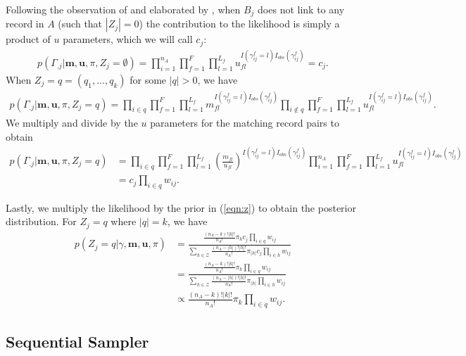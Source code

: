\documentclass[12pt,letterpaper]{article}
\newcommand{\1}[1]{\mathbb{I}\!\left[#1\right]} %
\begin{document}
Following the observation of \cite{wortman2019} and elaborated by \cite{kundinger_2023}, when $B_j$ does not link to any record in $A$ (such that $|Z_j| = 0$) the contribution to the likelihood is simply a product of $u$ parameters, which we will call $c_j$:
\begin{align}
	p(\Gamma_{.j}| \bm{m}, \bm{u}, \pi, Z_j = \emptyset) = \prod_{i=1}^{n_A}\prod_{f=1}^{F}\prod_{l=1}^{L_f} u_{fl}^{I(\gamma_{ij}^f = l)I_{obs}(\gamma_{ij}^f)} = c_j.
\end{align}
When $Z_j = q =  (q_1, \ldots, q_k)$ for some $|q| > 0$, we have
\begin{align}
	p(\Gamma_{.j}| \bm{m}, \bm{u}, \pi,  Z_j = q) =\prod_{i \in q}\prod_{f=1}^{F}\prod_{l=1}^{L_f} m_{fl}^{I(\gamma_{ij}^f = l)I_{obs}(\gamma_{ij}^f)}  \prod_{i \notin q}\prod_{f=1}^{F}\prod_{l=1}^{L_f} u_{fl}^{I(\gamma_{ij}^f = l)I_{obs}(\gamma_{ij}^f)}.
\end{align}
We multiply and divide by the $u$ parameters for the matching record pairs to obtain
\begin{align}
	p(\Gamma_{.j}| \bm{m}, \bm{u}, \pi, Z_j = q) &= \prod_{i \in q}\prod_{f=1}^{F}\prod_{l=1}^{L_f} \left(\frac{m_{fl}}{u_{fl}}\right)^{I(\gamma_{ij}^f = l)I_{obs}(\gamma_{ij}^f)}  \prod_{i = 1}^{n_A}\prod_{f=1}^{F}\prod_{l=1}^{L_f} u_{fl}^{I(\gamma_{ij}^f = l)I_{obs}(\gamma_{ij}^f)} \\
	&= c_j \prod_{i \in q} w_{ij} .
\end{align}

Lastly, we multiply the likelihood by the prior in (\ref{eqn:z}) to obtain the posterior distribution. For $Z_j = q$ where $|q| = k$, we have
\begin{subequations}
	\begin{align}
		p\left(Z_j  = q|\gamma, \bm{m}, \bm{u}, \pi \right) &= \frac{\frac{(n_A - k)!|k|!}{n_A!} \pi_{k} c_j \prod_{i \in q} w_{ij}}{\sum_{h \in \mathcal{Z}} \frac{(n_A - |h|)!|h|!}{n_A!} \pi_{|h|} c_j \prod_{i \in h} w_{ij}} \\
		&= \frac{\frac{(n_A - k)!|k|!}{n_A!} \pi_{k} \prod_{i \in q} w_{ij}}{\sum_{h \in \mathcal{Z}} \frac{(n_A - |h|)!|h|!}{n_A!} \pi_{|h|} \prod_{i \in h} w_{ij}} \\
		&\propto \frac{(n_A - k)!|k|!}{n_A!} \pi_{k} \prod_{i \in q} w_{ij}. \label{eqn:joint_posterior}
	\end{align}
\end{subequations}

\subsection{Sequential Sampler}\label{sec:sequential-sampler} 
\end{document}
